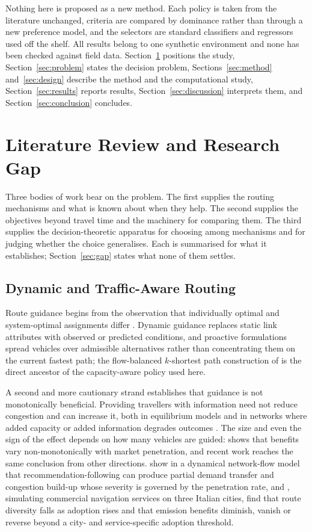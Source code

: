 \documentclass[preprint,12pt]{elsarticle}
\begin{document}
Nothing here is proposed as a new method. Each policy is taken from the
literature unchanged, criteria are compared by dominance rather than through a
new preference model, and the selectors are standard classifiers and regressors
used off the shelf. All results belong to one synthetic environment and none has
been checked against field data.
Section~\ref{sec:lit} positions the study, Section~\ref{sec:problem} states the
decision problem, Sections~\ref{sec:method} and~\ref{sec:design} describe the
method and the computational study, Section~\ref{sec:results} reports results,
Section~\ref{sec:discussion} interprets them, and
Section~\ref{sec:conclusion} concludes.

\section{Literature Review and Research Gap}
\label{sec:lit}

Three bodies of work bear on the problem. The first supplies the routing
mechanisms and what is known about when they help. The second supplies the
objectives beyond travel time and the machinery for comparing them. The third
supplies the decision-theoretic apparatus for choosing among mechanisms and for
judging whether the choice generalises. Each is summarised for what it
establishes; Section~\ref{sec:gap} states what none of them settles.

\subsection{Dynamic and Traffic-Aware Routing}
\label{sec:lit:routing}

Route guidance begins from the observation that individually optimal and
system-optimal assignments differ \citep{wardrop1952}. Dynamic guidance replaces
static link attributes with observed or predicted conditions, and proactive
formulations spread vehicles over admissible alternatives rather than
concentrating them on the current fastest path; the flow-balanced $k$-shortest
path construction of \citet{pan2013proactive} is the direct ancestor of the
capacity-aware policy used here.

A second and more cautionary strand establishes that guidance is not
monotonically beneficial. Providing travellers with information need not reduce
congestion and can increase it, both in equilibrium models
\citep{arnott1991information} and in networks where added capacity or added
information degrades outcomes \citep{acemoglu2018braess}. The size and even the
sign of the effect depends on how many vehicles are guided: \citet{yang1998penetration}
shows that benefits vary non-monotonically with market penetration, and recent
work reaches the same conclusion from other directions. \citet{toso2024detrimental}
show in a dynamical network-flow model that recommendation-following can produce
partial demand transfer and congestion build-up whose severity is governed by the
penetration rate, and \citet{cornacchia2026concentration}, simulating commercial
navigation services on three Italian cities, find that route diversity falls as
adoption rises and that emission benefits diminish, vanish or reverse beyond a
city- and service-specific adoption threshold.
\end{document}

